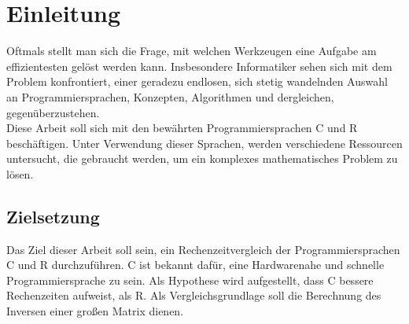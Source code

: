 %

\chapter{Einleitung}
Oftmals stellt man sich die Frage, mit welchen Werkzeugen eine Aufgabe am effizientesten gelöst werden kann. Insbesondere Informatiker sehen sich mit dem Problem konfrontiert, einer geradezu endlosen, sich stetig wandelnden Auswahl an Programmiersprachen, Konzepten, Algorithmen und dergleichen, gegenüberzustehen.\\
Diese Arbeit soll sich mit den bewährten Programmiersprachen C und R beschäftigen. Unter Verwendung dieser Sprachen, werden verschiedene Ressourcen untersucht, die gebraucht werden, um ein komplexes mathematisches Problem zu lösen.

\section{Zielsetzung}
Das Ziel dieser Arbeit soll sein, ein Rechenzeitvergleich der Programmiersprachen C und R durchzuführen. C ist bekannt dafür, eine Hardwarenahe und schnelle Programmiersprache zu sein. Als Hypothese wird aufgestellt, dass C bessere Rechenzeiten aufweist, als R. Als Vergleichsgrundlage soll die Berechnung des Inversen einer großen Matrix dienen.


